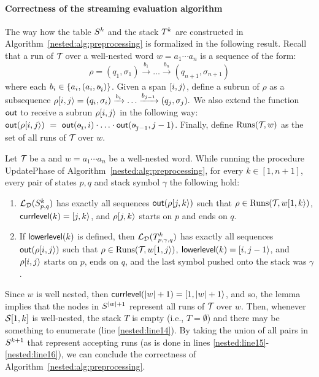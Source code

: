 \paragraph{Correctness of the streaming evaluation algorithm} The way how the table $S^k$ and the stack $T^k$ are constructed in Algorithm~\ref{nested:alg:preprocessing} is formalized in the following result. Recall that a run of $\mathcal{T}\!$ over a well-nested word $w = a_1\cdots a_n$ is a sequence of the form:
\[
\rho = (q_1, \sigma_1) \xrightarrow{b_1} \ldots  \xrightarrow{b_n} (q_{n+1}, \sigma_{n+1})
\]
where each $b_i\in\{a_i, (a_i, \oout_i)\}$.
Given a span $[i,j\rangle$, define a subrun of $\rho$ as a subsequence
$
\rho[i,j\rangle = (q_i, \sigma_i) \xrightarrow{b_{i}}  \ldots  \xrightarrow{b_{j-1}} (q_j, \sigma_j).
$
We also extend the function $\textsf{out}$ to receive a subrun $\rho[i,j\rangle$ in the following way:
$
\out(\rho\spanc{i}{j}) \ = \  \out(\oout_{i},{i}) \cdot \ldots \cdot \out(\oout_{j-1}, j-1)
$.
Finally, define $\operatorname{Runs}(\mathcal{T}\!,w)$ as the set of all runs of $\mathcal{T}\!$ over $w$. %

\begin{lemma}\label{nested:vpt:steps}
	Let $\mathcal{T}\!$ be a \vpann and $w = a_1\cdots a_n$ be a well-nested word. While running the procedure {\sc UpdatePhase} of Algorithm~\ref{nested:alg:preprocessing}, for every $k\in[1,n+1]$, every pair of states $p,q$ and stack symbol $\gamma$ the following hold:
	\begin{enumerate}
		\item $\mathcal{L}_{\mathcal{D}}(S^k_{p,q})$ has exactly all sequences $\textsf{out}(\rho[j,k\rangle)$ such that $\rho\in\operatorname{Runs}(\mathcal{T}\!,w[1,k\rangle)$, ${\sf currlevel}(k) = [j,k\rangle$, and $\rho[j,k\rangle$ starts on $p$ and ends on $q$.
		\item If ${\sf lowerlevel}(k)$ is defined,  then $\mathcal{L}_{\mathcal{D}}(T^k_{p,\gamma,q})$ has exactly all sequences $\textsf{out}(\rho[i,j\rangle)$ such that $\rho\in\operatorname{Runs}(\mathcal{T}\!,w[1,j\rangle)$, ${\sf lowerlevel}(k) = [i,j-1\rangle$, and $\rho[i,j\rangle$ starts on $p$, ends on $q$, and the last symbol pushed onto the stack was $\gamma$.
	\end{enumerate}
\end{lemma}




Since $w$ is well nested, then  ${\sf currlevel}(|w|+1) = [1,|w|+1\rangle$, and so, the lemma implies that the nodes in $S^{|w|+1}$ represent all runs of $\mathcal{T}\!$ over $w$. 
Then, whenever $\mathcal{S}[1, k]$ is well-nested, the stack $T$ is empty (i.e., $T = \emptyset$) and there may be something to enumerate (line \ref{nested:line14}). 
By taking the union of all pairs
in $S^{k+1}$ that represent accepting runs (as is done in lines \ref{nested:line15}-\ref{nested:line16}), we can conclude the correctness of Algorithm~\ref{nested:alg:preprocessing}.

